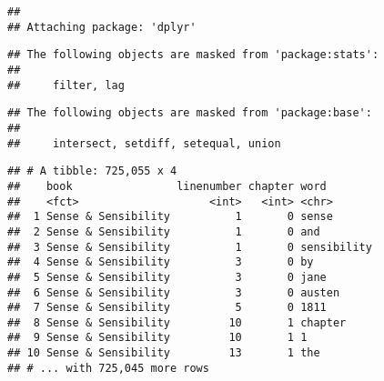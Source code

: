 \documentclass[]{article}
\newenvironment{Shaded}{\begin{snugshade}}{\end{snugshade}}
\newcommand{\KeywordTok}[1]{\textcolor[rgb]{0.13,0.29,0.53}{\textbf{#1}}}
\newcommand{\DataTypeTok}[1]{\textcolor[rgb]{0.13,0.29,0.53}{#1}}
\newcommand{\CharTok}[1]{\textcolor[rgb]{0.31,0.60,0.02}{#1}}
\newcommand{\StringTok}[1]{\textcolor[rgb]{0.31,0.60,0.02}{#1}}
\newcommand{\OtherTok}[1]{\textcolor[rgb]{0.56,0.35,0.01}{#1}}
\newcommand{\OperatorTok}[1]{\textcolor[rgb]{0.81,0.36,0.00}{\textbf{#1}}}
\newcommand{\NormalTok}[1]{#1}
\begin{document}
\begin{verbatim}
## 
## Attaching package: 'dplyr'
\end{verbatim}

\begin{verbatim}
## The following objects are masked from 'package:stats':
## 
##     filter, lag
\end{verbatim}

\begin{verbatim}
## The following objects are masked from 'package:base':
## 
##     intersect, setdiff, setequal, union
\end{verbatim}

\begin{Shaded}
\end{Shaded}

\begin{verbatim}
## # A tibble: 725,055 x 4
##    book                linenumber chapter word       
##    <fct>                    <int>   <int> <chr>      
##  1 Sense & Sensibility          1       0 sense      
##  2 Sense & Sensibility          1       0 and        
##  3 Sense & Sensibility          1       0 sensibility
##  4 Sense & Sensibility          3       0 by         
##  5 Sense & Sensibility          3       0 jane       
##  6 Sense & Sensibility          3       0 austen     
##  7 Sense & Sensibility          5       0 1811       
##  8 Sense & Sensibility         10       1 chapter    
##  9 Sense & Sensibility         10       1 1          
## 10 Sense & Sensibility         13       1 the        
## # ... with 725,045 more rows
\end{verbatim}
\end{document}
